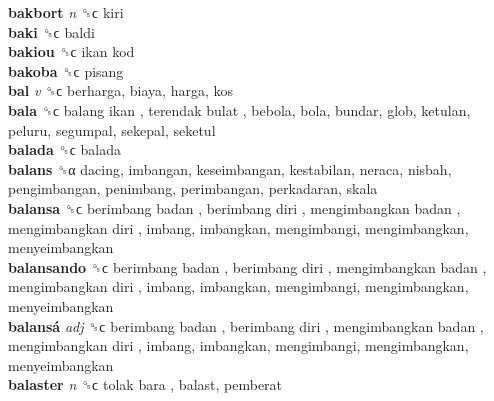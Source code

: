 \textbf{bakbort} \emph{n}  ␝ϲ  kiri  \\
\textbf{baki} ␝ϲ  baldi  \\
\textbf{bakiou} ␝ϲ   ikan kod   \\
\textbf{bakoba} ␝ϲ  pisang  \\
\textbf{bal} \emph{v}  ␝ϲ  berharga, biaya, harga, kos  \\
\textbf{bala} ␝ϲ   balang ikan ,  terendak bulat , bebola, bola, bundar, glob, ketulan, peluru, segumpal, sekepal, seketul  \\
\textbf{balada} ␝ϲ  balada  \\
\textbf{balans} ␝α  dacing, imbangan, keseimbangan, kestabilan, neraca, nisbah, pengimbangan, penimbang, perimbangan, perkadaran, skala  \\
\textbf{balansa} ␝ϲ   berimbang badan ,  berimbang diri ,  mengimbangkan badan ,  mengimbangkan diri , imbang, imbangkan, mengimbangi, mengimbangkan, menyeimbangkan  \\
\textbf{balansando} ␝ϲ   berimbang badan ,  berimbang diri ,  mengimbangkan badan ,  mengimbangkan diri , imbang, imbangkan, mengimbangi, mengimbangkan, menyeimbangkan  \\
\textbf{balansá} \emph{adj}  ␝ϲ   berimbang badan ,  berimbang diri ,  mengimbangkan badan ,  mengimbangkan diri , imbang, imbangkan, mengimbangi, mengimbangkan, menyeimbangkan  \\
\textbf{balaster} \emph{n}  ␝ϲ   tolak bara , balast, pemberat  \\
